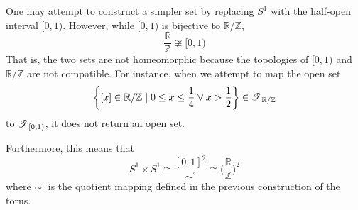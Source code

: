 \begin{example}
      One may attempt to construct a simpler set by replacing $S^1$ with the half-open interval $[0,1)$. However, while $[0,1)$ is bijective to $\mathbb{R} / \mathbb{Z}$,
      \begin{equation}
        \frac{\mathbb{R}}{\mathbb{Z}} \not\cong [0,1)
      \end{equation}
      That is, the two sets are not homeomorphic because the topologies of $[0,1)$ and $\mathbb{R} / \mathbb{Z}$ are not compatible. For instance, when we attempt to map the open set 
      \begin{equation}
        \bigg\{ [x] \in \mathbb{R} / \mathbb{Z} \mid 0 \leq x \leq \frac{1}{4} \vee x > \frac{1}{2} \bigg\} \in \T_{\mathbb{R} / \mathbb{Z}}
      \end{equation}
      to $\T_{[0,1)}$, it does not return an open set. 

      Furthermore, this means that
      \begin{equation}
        S^1 \times S^1 \cong \frac{[0,1]^2}{\sim^\prime} \cong \bigg( \frac{\mathbb{R}}{\mathbb{Z}} \bigg)^2
      \end{equation}
      where $\sim^\prime$ is the quotient mapping defined in the previous construction of the torus. 
    \end{example}

